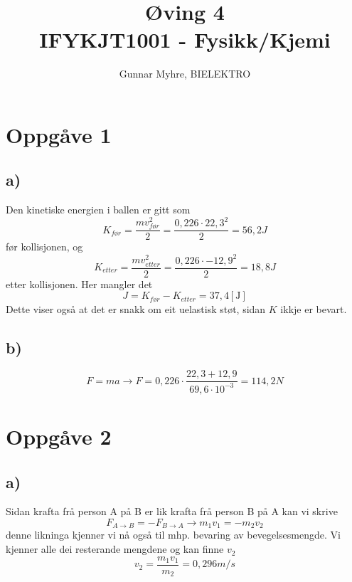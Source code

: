 \documentclass[12pt,a4paper]{article}
\title{%
  Øving 4 \\
  \large IFYKJT1001 - Fysikk/Kjemi \\
  }
\author{Gunnar Myhre, BIELEKTRO}
\begin{document}
  \maketitle

  \section*{Oppgåve 1}
    \subsection*{a)}
    Den kinetiske energien i ballen er gitt som
    \begin{equation}
      K_{før} = \frac{mv_{før}^2}{2} = \frac{0,226\cdot 22,3^2}{2} = 56,2 J
    \end{equation}
    før kollisjonen, og
    \begin{equation}
      K_{etter} = \frac{mv_{etter}^2}{2} = \frac{0,226\cdot -12,9^2}{2} = 18,8J
    \end{equation}
    etter kollisjonen. Her mangler det
    \begin{equation}
      J = K_{før} - K_{etter} = 37,4[\si{\joule}]
    \end{equation}
    Dette viser også at det er snakk om eit uelastisk støt, sidan $K$ ikkje er bevart.

    \subsection*{b)}
    \begin{equation}
      F=ma \rightarrow F = 0,226\cdot \frac{22,3+12,9}{69,6\cdot 10^{-3}} = 114,2N
    \end{equation}

  \newpage

  \section*{Oppgåve 2}
    \subsection*{a)}
    Sidan krafta frå person A på B er lik krafta frå person B på A kan vi skrive
    \begin{equation}
      F_{A \rightarrow B} = - F_{B \rightarrow A} \rightarrow
      m_1v_1 = - m_2v_2 
    \end{equation}
    denne likninga kjenner vi nå også til mhp. bevaring av bevegelsesmengde. Vi kjenner
    alle dei resterande mengdene og kan finne $v_2$
    \begin{equation}
      v_2 = \frac{m_1v_1}{m_2} = 0,296m/s
    \end{equation}
\end{document}
